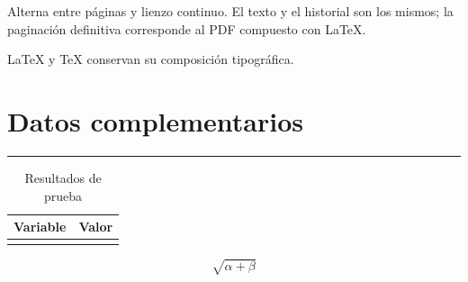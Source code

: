\documentclass[12pt,a4paper,oneside,openany]{book}
\begin{document}
Alterna entre páginas y lienzo continuo. El texto y el historial son los mismos; la paginación definitiva corresponde al PDF compuesto con \LaTeX{}.

\LaTeX{} y \TeX{} conservan su composición tipográfica.

\appendix
\chapter{Datos complementarios}\label{b4143D4B2-BB4C-436C-9155-910AA4D3B1F0}

\par\medskip\noindent\rule{\linewidth}{0.4pt}\par\medskip

\begin{table}[htbp]\centering\caption{Resultados de prueba}\label{n2AF5B987-CC65-4350-9C6F-5B6C5B88C01F}
\begin{tabularx}{\linewidth}{|>{\raggedright\arraybackslash}X|>{\raggedright\arraybackslash}X|}\hline
\textbf{Variable} & \textbf{Valor} \\ \hline
 &  \\ \hline
\end{tabularx}\par{\small }\end{table}

\begin{equation}\sqrt{\alpha  + \beta }\label{nAD0BEBB6-DF54-4EFE-A6FD-780A26EF25C4}\end{equation}
\end{document}
